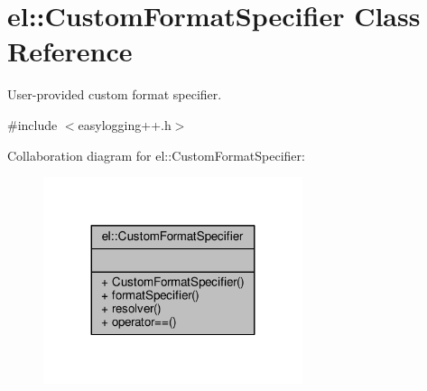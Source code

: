 \hypertarget{classel_1_1CustomFormatSpecifier}{}\section{el\+:\+:Custom\+Format\+Specifier Class Reference}
\label{classel_1_1CustomFormatSpecifier}


User-\/provided custom format specifier.  




{\ttfamily \#include $<$easylogging++.\+h$>$}



Collaboration diagram for el\+:\+:Custom\+Format\+Specifier\+:
\nopagebreak
\begin{figure}[H]
\begin{center}
\leavevmode
\includegraphics[width=215pt]{df/d50/classel_1_1CustomFormatSpecifier__coll__graph}
\end{center}
\end{figure}

